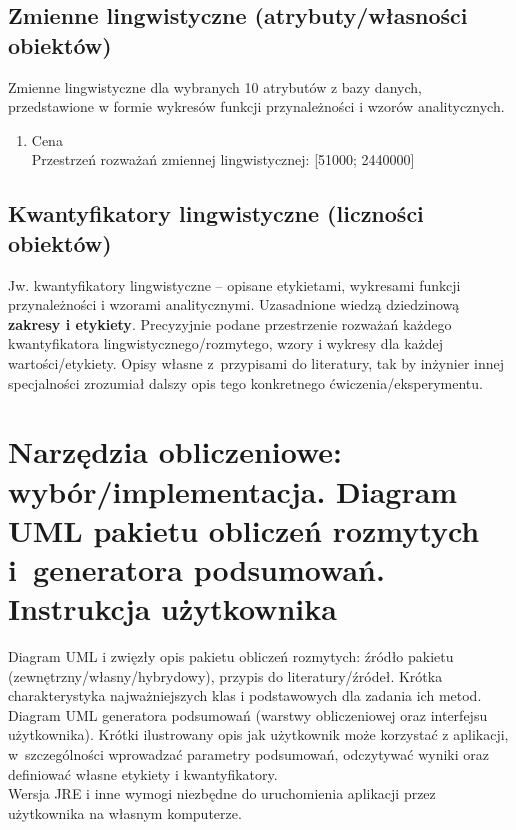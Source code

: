\documentclass{classrep}
\begin{document}
\subsection{Zmienne lingwistyczne (atrybuty/własności obiektów)}
Zmienne lingwistyczne dla wybranych 10 atrybutów z bazy danych, przedstawione w
formie wykresów funkcji przynależności i wzorów analitycznych.
\begin{enumerate}
	\item Cena\\
	Przestrzeń rozważań zmiennej lingwistycznej:  [51000; 2440000]

    	    
\end{enumerate}
\subsection{Kwantyfikatory lingwistyczne (liczności obiektów)}
Jw. kwantyfikatory lingwistyczne -- opisane etykietami, wykresami funkcji
przynależności i wzorami analitycznymi. Uzasadnione wiedzą dziedzinową  
{\bf zakresy i etykiety}. Precyzyjnie podane przestrzenie rozważań każdego kwantyfikatora 
lingwistycznego/rozmytego, wzory i wykresy dla każdej wartości/etykiety. Opisy własne z~przypisami do literatury, tak by inżynier innej specjalności zrozumiał dalszy
opis tego konkretnego ćwiczenia/eksperymentu.  

\section{Narzędzia obliczeniowe: wybór/implementacja. Diagram UML pakietu
obliczeń rozmytych i~generatora podsumowań. Instrukcja użytkownika}

Diagram UML i zwięzły opis pakietu obliczeń rozmytych: źródło pakietu
(zewnętrzny/własny/hybrydowy), przypis do literatury/źródeł. Krótka charakterystyka
najważniejszych klas i podstawowych dla zadania ich metod. \\

Diagram UML generatora podsumowań (warstwy obliczeniowej oraz interfejsu
użytkownika). Krótki ilustrowany opis jak użytkownik może korzystać z aplikacji, w~szczególności
wprowadzać parametry  podsumowań, odczytywać wyniki oraz definiować własne etykiety i
kwantyfikatory.\\

Wersja JRE i inne wymogi niezbędne do uruchomienia aplikacji przez użytkownika na własnym komputerze. 
\end{document}
